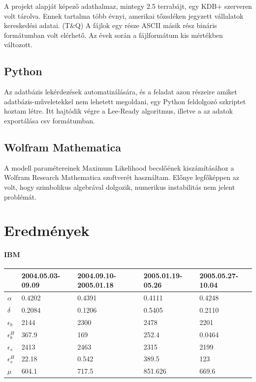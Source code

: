 \documentclass[]{article}
\begin{document}
A projekt alapját képező adathalmaz, mintegy 2.5 terrabájt, egy KDB+ szerveren volt tárolva. Ennek tartalma több évnyi, amerikai tőzsdéken jegyzett vállalatok kereskedési adatai. (T\&Q)
A fájlok egy része ASCII másik rész bináris formátumban volt elérhető. Az évek során a fájlformátum kis mértékben változott.
\subsection{Python}
Az adatbázis lekérdezések automatizálására, és a feladat azon részeire amiket adatbázis-műveletekkel nem lehetett megoldani, egy Python feldolgozó szkriptet hoztam létre. Itt hajtódik végre a Lee-Ready algoritmus, illetve a az adatok exportálása csv formátumban.
\subsection{Wolfram Mathematica}
A modell paramétereinek Maximum Likelihood becslőének kiszámításához a Wolfram Research Mathematica szoftverét használtam. Előnye legfőképpen az volt, hogy szimbolikus algebrával dolgozik, numerikus instabilitás nem jelent problémát.


\section{Eredmények}


\paragraph{IBM}

\begin{center}
	\begin{tabular}{| l | l | l | l |l |}
		\hline
		 & 2004.05.03-09.09 & 2004.09.10-2005.01.18 & 2005.01.19-05.26 & 2005.05.27-10.04 \\ \hline
		$\alpha$ & 0.4202 & 0.4391 & 0.4111 &0.4248 \\ \hline
		$\delta$ & 0.2084 & 0.1206 & 0.5405 &0.2110\\ \hline
		$\epsilon_b$ & 2144 & 2300 & 2478 &2201 \\ \hline
		$\epsilon_b^H$ & 367.9 & 169 & 252.4 &0.0464 \\ \hline
		$\epsilon_s$ & 2413 & 2463 & 2315 &2199 \\ \hline
		$\epsilon_s^H$ & 22.18 & 0.542 & 389.5 &123 \\ \hline
		$\mu$ & 604.1 & 717.5 & 851.626 & 669.6\\ \hline
	\end{tabular}
\end{center}
\end{document}

